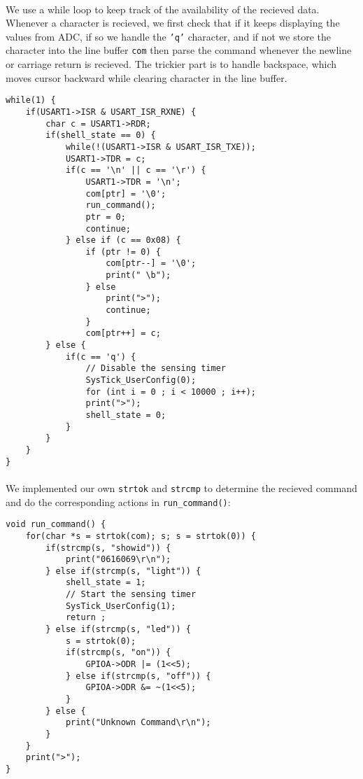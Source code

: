 \paragraph{}
We use a while loop to keep track of the availability of the recieved data.
Whenever a character is recieved, we first check that if it keeps displaying the values from ADC,
if so we handle the \texttt{'q'} character,
and if not we store the character into the line buffer \texttt{com} then parse the command whenever the newline or carriage return is recieved.
The trickier part is to handle backspace, which moves cursor backward while clearing character in the line buffer.
\begin{lstlisting}
while(1) {
    if(USART1->ISR & USART_ISR_RXNE) {
        char c = USART1->RDR;
        if(shell_state == 0) {
            while(!(USART1->ISR & USART_ISR_TXE));
            USART1->TDR = c;
            if(c == '\n' || c == '\r') {
                USART1->TDR = '\n';
                com[ptr] = '\0';
                run_command();
                ptr = 0;
                continue;
            } else if (c == 0x08) {
                if (ptr != 0) {
                    com[ptr--] = '\0';
                    print(" \b");
                } else 
                    print(">");
                    continue;
                }
                com[ptr++] = c;
        } else {
            if(c == 'q') {
                // Disable the sensing timer
                SysTick_UserConfig(0);
                for (int i = 0 ; i < 10000 ; i++);
                print(">");
                shell_state = 0;
            }
        }
    }
}
\end{lstlisting}
\paragraph{}
We implemented our own \texttt{strtok} and \texttt{strcmp} to determine the recieved command and do the corresponding actions in \texttt{run\_command()}:
\begin{lstlisting}
void run_command() {
	for(char *s = strtok(com); s; s = strtok(0)) {
		if(strcmp(s, "showid")) {
			print("0616069\r\n");
		} else if(strcmp(s, "light")) {
			shell_state = 1;
            // Start the sensing timer
			SysTick_UserConfig(1);
			return ;
		} else if(strcmp(s, "led")) {
			s = strtok(0);
			if(strcmp(s, "on")) {
				GPIOA->ODR |= (1<<5);
			} else if(strcmp(s, "off")) {
				GPIOA->ODR &= ~(1<<5);
			}
		} else {
			print("Unknown Command\r\n");
		}
	}
	print(">");
}
\end{lstlisting}
